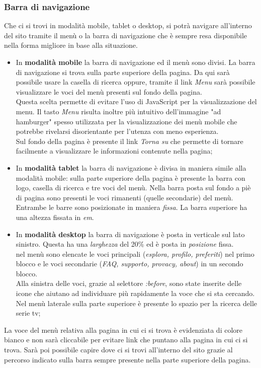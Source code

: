 \subsubsection{Barra di navigazione}
Che ci si trovi in modalità mobile, tablet o desktop, si potrà navigare all'interno del sito tramite il menù o la barra di navigazione che è sempre resa disponibile nella forma migliore in base alla situazione.\\
\begin{itemize}
	\item In \textbf{modalità mobile} la barra di navigazione ed il menù sono divisi. La barra di navigazione si trova sulla parte superiore della pagina. Da qui sarà possibile usare la casella di ricerca oppure, tramite il link \textit{Menu} sarà possibile visualizzare le voci del menù presenti sul fondo della pagina.\\
	Questa scelta permette di evitare l'uso di JavaScript per la visualizzazione del menu. Il tasto \textit{Menu} risulta inoltre più intuitivo dell'immagine "ad hamburger" spesso utilizzata per la visualizzazione dei menù mobile che potrebbe rivelarsi disorientante per l'utenza con meno esperienza.\\
	Sul fondo della pagina è presente il link \textit{Torna su} che permette di tornare facilmente a visualizzare le informazioni contenute nella pagina;
	
	\item In \textbf{modalità tablet} la barra di navigazione è divisa in maniera simile alla modalità mobile: sulla parte superiore della pagina è presente la barra con logo, casella di ricerca e tre voci del menù. Nella barra posta sul fondo a piè di pagina sono presenti le voci rimanenti (quelle secondarie) del menù.\\
	Entrambe le barre sono posizionate in maniera \textit{fissa}. La barra superiore ha una altezza fissata in \textit{em}.\\
	
	\item In \textbf{modalità desktop} la barra di navigazione è posta in verticale sul lato sinistro. Questa ha una \textit{larghezza} del 20\% ed è posta in \textit{posizione} fissa.\\
	nel menù sono elencate le voci principali (\textit{esplora, profilo, preferiti}) nel primo blocco e le voci secondarie (\textit{FAQ, supporto, provacy, about}) in un secondo blocco.\\
	Alla sinistra delle voci, grazie al selettore \textit{:before}, sono state inserite delle icone che aiutano ad individuare più rapidamente la voce che si sta cercando.\\
	Nel menù laterale sulla parte superiore è presente lo spazio per la ricerca delle serie tv;
\end{itemize}
	La voce del menù relativa alla pagina in cui ci si trova è evidenziata di colore bianco e non sarà cliccabile per evitare link che puntano alla pagina in cui ci si trova.
	Sarà poi possibile capire dove ci si trovi all'interno del sito grazie al percorso indicato sulla barra sempre presente nella parte superiore della pagina.

